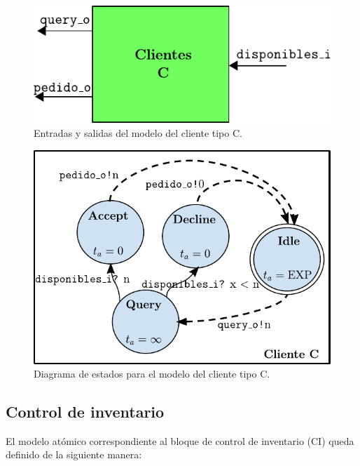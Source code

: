 \documentclass[10pt]{article}
\begin{document}
\begin{figure}[htbp]
	\centering
	\includegraphics{img/CTC-esquematico}
	\caption{Entradas y salidas del modelo del cliente tipo C.}
	\label{fig:CTC-esquematico}
\end{figure}

\begin{figure}[htbp]
	\centering
	\includegraphics{img/clienteCdevsgraph}
	\caption{Diagrama de estados para el modelo del cliente tipo C.}
	\label{fig:CTC-estados}
\end{figure}



\subsection{Control de inventario\label{sec:CI}}
El modelo atómico correspondiente al bloque de control de inventario (CI) queda definido de la siguiente manera:
\end{document}
